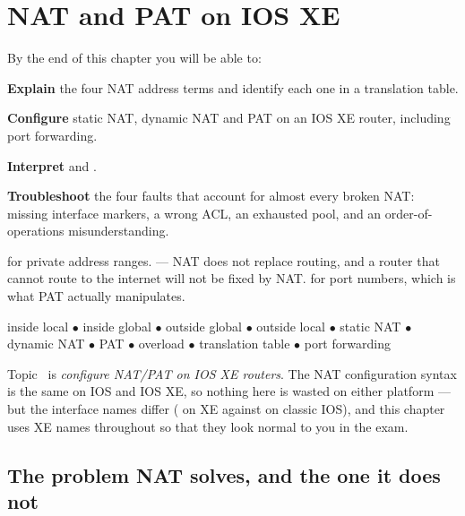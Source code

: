 \chapter{NAT and PAT on IOS XE}\label{ch:nat}

\begin{outcomes}
By the end of this chapter you will be able to:
\begin{tight}
  \item \textbf{Explain} the four NAT address terms and identify each one in a
        translation table.
  \item \textbf{Configure} static NAT, dynamic NAT and PAT on an IOS XE router,
        including port forwarding.
  \item \textbf{Interpret}  and
        .
  \item \textbf{Troubleshoot} the four faults that account for almost every broken
        NAT: missing interface markers, a wrong ACL, an exhausted pool, and an
        order-of-operations misunderstanding.
\end{tight}
\end{outcomes}

\begin{prereq}
 for private address ranges.  --- NAT does not
replace routing, and a router that cannot route to the internet will not be fixed
by NAT.  for port numbers, which is what PAT actually
manipulates.
\end{prereq}

\begin{keyterms}
inside local $\bullet$ inside global $\bullet$ outside global $\bullet$ outside
local $\bullet$ static NAT $\bullet$ dynamic NAT $\bullet$ PAT $\bullet$ overload
$\bullet$ translation table $\bullet$ port forwarding
\end{keyterms}

\begin{examnote}
Topic~ is \emph{configure NAT/PAT on IOS XE routers}. The NAT
configuration syntax is the same on IOS and IOS XE, so nothing here is wasted on
either platform --- but the interface names differ
( on XE against  on classic
IOS), and this chapter uses XE names throughout so that they look normal to you
in the exam.
\end{examnote}

\section{The problem NAT solves, and the one it does not}

